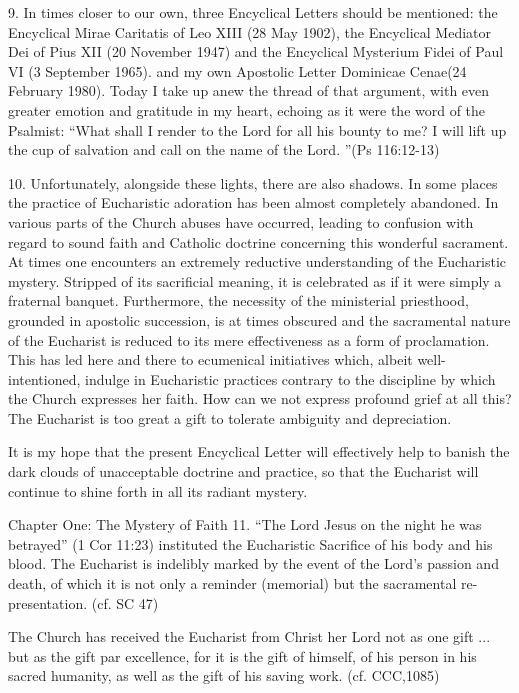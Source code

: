 \documentclass[oneside]{book}
\begin{document}
9. In times closer to our own, three Encyclical Letters should be mentioned: the
Encyclical Mirae Caritatis of Leo XIII (28 May 1902), the Encyclical Mediator
Dei of Pius XII (20 November 1947) and the Encyclical Mysterium Fidei of Paul VI
(3 September 1965). and my own Apostolic Letter Dominicae Cenae(24 February
1980). Today I take up anew the thread of that argument, with even greater
emotion and gratitude in my heart, echoing as it were the word of the Psalmist:
``What shall I render to the Lord for all his bounty to me? I will lift up the
cup of salvation and call on the name of the Lord. ''(Ps 116:12-13)

10. Unfortunately, alongside these lights, there are also shadows. In some
places the practice of Eucharistic adoration has been almost completely
abandoned. In various parts of the Church abuses have occurred, leading to
confusion with regard to sound faith and Catholic doctrine concerning this
wonderful sacrament. At times one encounters an extremely reductive
understanding of the Eucharistic mystery. Stripped of its sacrificial meaning,
it is celebrated as if it were simply a fraternal banquet. Furthermore, the
necessity of the ministerial priesthood, grounded in apostolic succession, is at
times obscured and the sacramental nature of the Eucharist is reduced to its
mere effectiveness as a form of proclamation. This has led here and there to
ecumenical initiatives which, albeit well-intentioned, indulge in Eucharistic
practices contrary to the discipline by which the Church expresses her
faith. How can we not express profound grief at all this? The Eucharist is too
great a gift to tolerate ambiguity and depreciation. 

It is my hope that the present Encyclical Letter will effectively help to banish
the dark clouds of unacceptable doctrine and practice, so that the Eucharist
will continue to shine forth in all its radiant mystery. 

Chapter One: The Mystery of Faith
11. ``The Lord Jesus on the night he was betrayed'' (1 Cor 11:23) instituted the
Eucharistic Sacrifice of his body and his blood. The Eucharist is indelibly
marked by the event of the Lord's passion and death, of which it is not only a
reminder (memorial) but the sacramental re-presentation. (cf. SC 47)

The Church has received the Eucharist from Christ her Lord not as one gift
... but as the gift par excellence, for it is the gift of himself, of his person
in his sacred humanity, as well as the gift of his saving work. (cf. CCC,1085)
\end{document}
